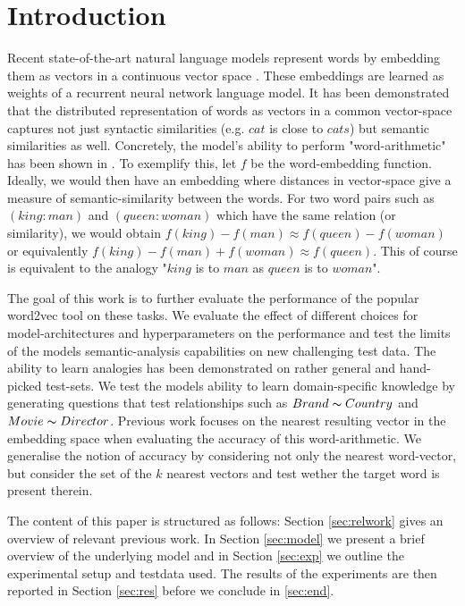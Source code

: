 \documentclass[conference]{IEEEtran}
\begin{document}
\section{Introduction}

Recent state-of-the-art natural language models represent words by embedding them
as vectors in a continuous vector space \cite{mikolov2013efficient} \cite{pennington2014glove}.
These embeddings are learned as weights of a recurrent neural network language model.
It has been demonstrated that the distributed representation of words as vectors
in a common vector-space captures not just syntactic similarities (e.g. $cat$
is close to $cats$) but semantic similarities as well. Concretely, the model's ability to
perform "word-arithmetic" has been shown in \cite{mikolov2013linguistic}.
To exemplify this, let $f$ be the word-embedding function. Ideally, we would then
have an embedding where distances in vector-space give a measure of
semantic-similarity between the words. For two word pairs such as $(king:man)$
and $(queen:woman)$ which have the same relation (or similarity), we would
obtain $f(king)-f(man) \approx f(queen) - f(woman)$ or equivalently $f(king)-f(man) +
f(woman) \approx f(queen)$. This of course is equivalent to the analogy "$king$ is
to $man$ as $queen$ is to $woman$". 

The goal of this work is to further evaluate the performance
of the popular word2vec tool on these tasks. We evaluate the effect of
different choices for model-architectures and hyperparameters on the performance and test
the limits of the models semantic-analysis capabilities on new challenging test data. 
The ability to learn analogies has  been demonstrated on rather general and 
hand-picked test-sets. We test the models ability to learn domain-specific knowledge by 
generating questions that test relationships such as $Brand \thicksim Country$ 
and $Movie \thicksim Director$. Previous work focuses on the nearest 
resulting vector in the embedding space when evaluating the accuracy of this word-arithmetic. 
We generalise the notion of accuracy by considering not only the nearest word-vector, but 
consider the set of the $k$ nearest vectors and test wether the target word is present therein. 


The content of this paper is structured as follows: Section \ref{sec:relwork} gives an overview 
of relevant previous work. In Section \ref{sec:model} we present a brief overview of the underlying 
model and in Section \ref{sec:exp} we outline the experimental setup and testdata used. 
The results of the experiments are then reported in Section \ref{sec:res} before we conclude
in \ref{sec:end}.
\end{document}
